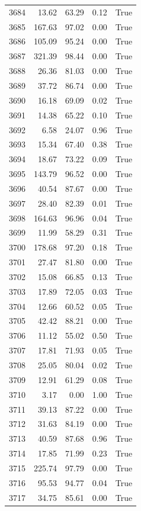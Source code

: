 \begin{longtable}{rrrrr}
3684 & 13.62 & 63.29 & 0.12 & True \\
3685 & 167.63 & 97.02 & 0.00 & True \\
3686 & 105.09 & 95.24 & 0.00 & True \\
3687 & 321.39 & 98.44 & 0.00 & True \\
3688 & 26.36 & 81.03 & 0.00 & True \\
3689 & 37.72 & 86.74 & 0.00 & True \\
3690 & 16.18 & 69.09 & 0.02 & True \\
3691 & 14.38 & 65.22 & 0.10 & True \\
3692 & 6.58 & 24.07 & 0.96 & True \\
3693 & 15.34 & 67.40 & 0.38 & True \\
3694 & 18.67 & 73.22 & 0.09 & True \\
3695 & 143.79 & 96.52 & 0.00 & True \\
3696 & 40.54 & 87.67 & 0.00 & True \\
3697 & 28.40 & 82.39 & 0.01 & True \\
3698 & 164.63 & 96.96 & 0.04 & True \\
3699 & 11.99 & 58.29 & 0.31 & True \\
3700 & 178.68 & 97.20 & 0.18 & True \\
3701 & 27.47 & 81.80 & 0.00 & True \\
3702 & 15.08 & 66.85 & 0.13 & True \\
3703 & 17.89 & 72.05 & 0.03 & True \\
3704 & 12.66 & 60.52 & 0.05 & True \\
3705 & 42.42 & 88.21 & 0.00 & True \\
3706 & 11.12 & 55.02 & 0.50 & True \\
3707 & 17.81 & 71.93 & 0.05 & True \\
3708 & 25.05 & 80.04 & 0.02 & True \\
3709 & 12.91 & 61.29 & 0.08 & True \\
3710 & 3.17 & 0.00 & 1.00 & True \\
3711 & 39.13 & 87.22 & 0.00 & True \\
3712 & 31.63 & 84.19 & 0.00 & True \\
3713 & 40.59 & 87.68 & 0.96 & True \\
3714 & 17.85 & 71.99 & 0.23 & True \\
3715 & 225.74 & 97.79 & 0.00 & True \\
3716 & 95.53 & 94.77 & 0.04 & True \\
3717 & 34.75 & 85.61 & 0.00 & True \\

\end{longtable}
